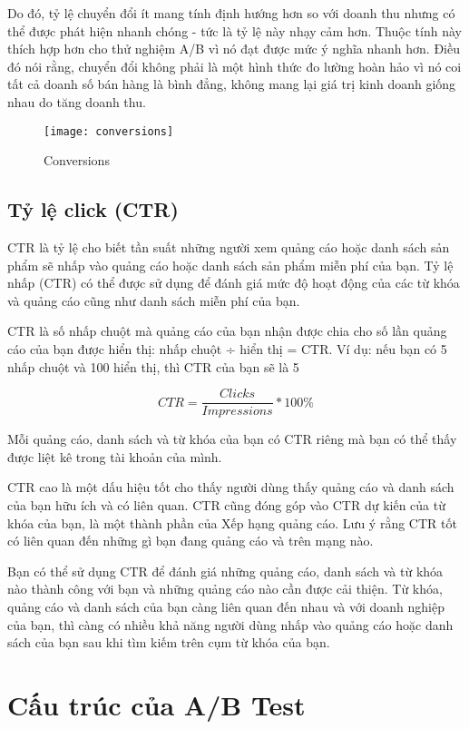 Do đó, tỷ lệ chuyển đổi ít mang tính định hướng hơn so với doanh thu nhưng có thể được phát hiện nhanh chóng - tức là tỷ lệ này nhạy cảm hơn. Thuộc tính này thích hợp hơn cho thử nghiệm A/B vì nó đạt được mức ý nghĩa nhanh hơn. Điều đó nói rằng, chuyển đổi không phải là một hình thức đo lường hoàn hảo vì nó coi tất cả doanh số bán hàng là bình đẳng, không mang lại giá trị kinh doanh giống nhau do tăng doanh thu.
\begin{figure}[ht]
	\centering
	\texttt{[image: conversions]}
	\caption{Conversions}
\end{figure}

\subsection{Tỷ lệ click (CTR)}

CTR là tỷ lệ cho biết tần suất những người xem quảng cáo hoặc danh sách sản phẩm sẽ nhấp vào quảng cáo hoặc danh sách sản phẩm miễn phí của bạn. Tỷ lệ nhấp (CTR) có thể được sử dụng để đánh giá mức độ hoạt động của các từ khóa và quảng cáo cũng như danh sách miễn phí của bạn.

CTR là số nhấp chuột mà quảng cáo của bạn nhận được chia cho số lần quảng cáo của bạn được hiển thị: nhấp chuột ÷ hiển thị = CTR. Ví dụ: nếu bạn có 5 nhấp chuột và 100 hiển thị, thì CTR của bạn sẽ là 5%

\begin{displaymath}
	CTR = \frac{Clicks}{Impressions} * 100\%
\end{displaymath}

Mỗi quảng cáo, danh sách và từ khóa của bạn có CTR riêng mà bạn có thể thấy được liệt kê trong tài khoản của mình.

CTR cao là một dấu hiệu tốt cho thấy người dùng thấy quảng cáo và danh sách của bạn hữu ích và có liên quan. CTR cũng đóng góp vào CTR dự kiến của từ khóa của bạn, là một thành phần của Xếp hạng quảng cáo. Lưu ý rằng CTR tốt có liên quan đến những gì bạn đang quảng cáo và trên mạng nào.

Bạn có thể sử dụng CTR để đánh giá những quảng cáo, danh sách và từ khóa nào thành công với bạn và những quảng cáo nào cần được cải thiện. Từ khóa, quảng cáo và danh sách của bạn càng liên quan đến nhau và với doanh nghiệp của bạn, thì càng có nhiều khả năng người dùng nhấp vào quảng cáo hoặc danh sách của bạn sau khi tìm kiếm trên cụm từ khóa của bạn.

\section{Cấu trúc của A/B Test}

